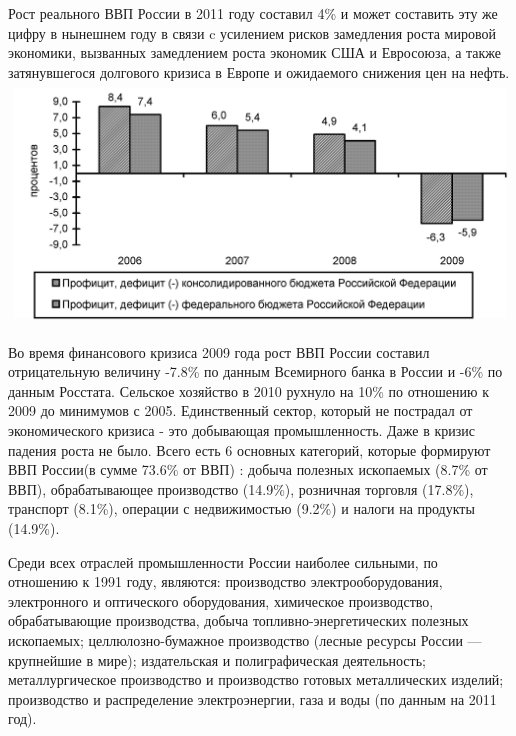 \documentclass[a4paper,12pt]{article}
\begin{document}
Рост реального ВВП России в 2011 году составил 4\% и может составить эту же
цифру в нынешнем году в связи c усилением рисков замедления роста мировой
экономики, вызванных замедлением роста экономик США и Евросоюза, а также 
затянувшегося долгового кризиса в Европе и ожидаемого снижения цен на
нефть. \cite{WorldBank2011} \\
\includegraphics[width=1\textwidth]{Image3549.jpeg}

Во время финансового кризиса 2009 года рост ВВП России составил отрицательную
величину -7.8\% по данным Всемирного банка в России и -6\% по данным Росстата.
Сельское хозяйство в 2010 рухнуло на 10\% по отношению к 2009 до минимумов с
2005. Единственный сектор, который не пострадал от экономического кризиса - это 
добывающая промышленность. Даже в кризис падения роста не было. Всего есть 6 
основных категорий, которые формируют ВВП России(в сумме 73.6\%
от ВВП) :
 добыча полезных ископаемых  (8.7\% от ВВП), 
 обрабатывающее производство (14.9\%), 
 розничная торговля (17.8\%), 
 транспорт (8.1\%), 
 операции с недвижимостью (9.2\%) и 
 налоги на продукты (14.9\%).

Среди всех отраслей промышленности России наиболее сильными, по отношению к 1991
году, являются: производство электрооборудования, электронного и оптического
оборудования, химическое производство, обрабатывающие производства, добыча топливно-энергетических полезных 
ископаемых; целлюлозно-бумажное производство (лесные ресурсы России — крупнейшие в мире); 
издательская и полиграфическая деятельность; металлургическое производство и производство 
готовых металлических изделий; производство и распределение электроэнергии, газа
и воды (по данным на 2011 год).
\end{document}
